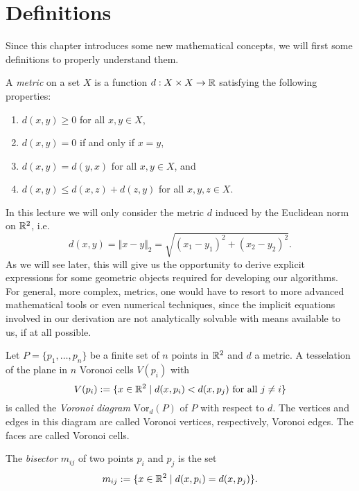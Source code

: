 \section{Definitions}
    Since this chapter introduces some new mathematical concepts, we will first some definitions to properly understand them. 

    \begin{definition}[Metric]
        \label{def:metric}
        A \emph{metric} on a set $X$ is a function $d: X \times X \rightarrow \mathbb{R}$ satisfying the following properties:
        \begin{enumerate}
        \item $d(x, y) \geq 0$ for all $x, y \in X$,
        \item $d(x, y) = 0$ if and only if $x = y$,   
        \item $d(x, y) = d(y, x)$ for all $x, y \in X$, and
        \item $d(x, y) \leq d(x, z) + d(z, y)$ for all $x, y, z \in X$.
        \end{enumerate}
    \end{definition}

    In this lecture we will only consider the metric $d$ induced by the Euclidean norm on $\mathbb{R}^2$, i.e.
    $$d(x, y) = \Vert x - y \Vert_2 = \sqrt{(x_1 - y_1)^2 + (x_2 - y_2)^2}.$$
    As we will see later, this will give us the opportunity to derive explicit expressions for some geometric objects required for developing our algorithms. For general, more complex, metrics, one would have to resort to more advanced mathematical tools or even numerical techniques, since the implicit equations involved in our derivation are not analytically solvable with means available to us, if at all possible. 

    \begin{definition} 
        Let $P = \{p_1, \dots, p_n\}$ be a finite set of $n$ points in $\mathbb{R}^2$ and $d$ a metric. A tesselation of the plane in $n$ Voronoi cells $V(p_i)$ with
        $$V(p_i) := \{x \in \mathbb{R}^2 \mid d(x, p_i) < d(x, p_j) \text{ for all } j \neq i\}$$
        is called the \emph{Voronoi diagram} $\text{Vor}_d(P)$ of $P$ with respect to $d$. The vertices and edges in this diagram are called Voronoi vertices, respectively, Voronoi edges. The faces are called Voronoi cells. 
    \end{definition}

    \begin{definition}[Bisector] 
        The \emph{bisector} $m_{ij}$ of two points $p_i$ and $p_j$ is the set
        $$m_{ij} := \{x \in \mathbb{R}^2 \mid d(x, p_i) = d(x, p_j)\}.$$
    \end{definition}

